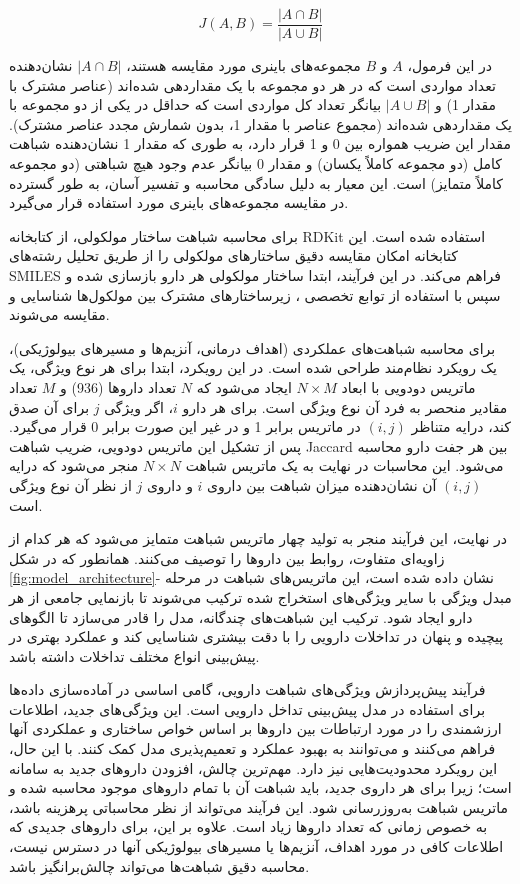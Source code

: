 \begin{equation}
	J(A,B) = \frac{|A \cap B|}{|A \cup B|}
\end{equation}

در این فرمول، $A$ و $B$ مجموعه‌های باینری مورد مقایسه هستند، $|A \cap B|$ نشان‌دهنده تعداد مواردی است که در هر دو مجموعه با یک مقداردهی شده‌اند (عناصر مشترک با مقدار 1) و $|A \cup B|$ بیانگر تعداد کل مواردی است که حداقل در یکی از دو مجموعه با یک مقداردهی شده‌اند (مجموع عناصر با مقدار 1، بدون شمارش مجدد عناصر مشترک). مقدار این ضریب همواره بین 0 و 1 قرار دارد، به طوری که مقدار 1 نشان‌دهنده شباهت کامل (دو مجموعه کاملاً یکسان) و مقدار 0 بیانگر عدم وجود هیچ شباهتی (دو مجموعه کاملاً متمایز) است. این معیار به دلیل سادگی محاسبه و تفسیر آسان، به طور گسترده در مقایسه مجموعه‌های باینری مورد استفاده قرار می‌گیرد.

برای محاسبه شباهت ساختار مولکولی، از کتابخانه RDKit استفاده شده است. این کتابخانه امکان مقایسه دقیق ساختارهای مولکولی را از طریق تحلیل رشته‌های SMILES فراهم می‌کند. در این فرآیند، ابتدا ساختار مولکولی هر دارو بازسازی شده و سپس با استفاده از توابع تخصصی ، زیرساختارهای مشترک بین مولکول‌ها شناسایی و مقایسه می‌شوند.

برای محاسبه شباهت‌های عملکردی (اهداف درمانی، آنزیم‌ها و مسیرهای بیولوژیکی)، یک رویکرد نظام‌مند طراحی شده است. در این رویکرد، ابتدا برای هر نوع ویژگی، یک ماتریس دودویی با ابعاد $N \times M$ ایجاد می‌شود که $N$ تعداد داروها (936) و $M$ تعداد مقادیر منحصر به فرد آن نوع ویژگی است. برای هر دارو $i$، اگر ویژگی $j$ برای آن صدق کند، درایه متناظر $(i,j)$ در ماتریس برابر 1 و در غیر این صورت برابر 0 قرار می‌گیرد. پس از تشکیل این ماتریس دودویی، ضریب شباهت Jaccard بین هر جفت دارو محاسبه می‌شود. این محاسبات در نهایت به یک ماتریس شباهت $N \times N$ منجر می‌شود که درایه $(i,j)$ آن نشان‌دهنده میزان شباهت بین داروی $i$ و داروی $j$ از نظر آن نوع ویژگی است.

در نهایت، این فرآیند منجر به تولید چهار ماتریس شباهت متمایز می‌شود که هر کدام از زاویه‌ای متفاوت، روابط بین داروها را توصیف می‌کنند. همانطور که در شکل \ref{fig:model_architecture}- نشان داده شده است، این ماتریس‌های شباهت در مرحله مبدل ویژگی با سایر ویژگی‌های استخراج شده ترکیب می‌شوند تا بازنمایی جامعی از هر دارو ایجاد شود. ترکیب این شباهت‌های چندگانه، مدل را قادر می‌سازد تا الگوهای پیچیده و پنهان در تداخلات دارویی را با دقت بیشتری شناسایی کند و عملکرد بهتری در پیش‌بینی انواع مختلف تداخلات داشته باشد.

فرآیند پیش‌پردازش ویژگی‌های شباهت دارویی، گامی اساسی در آماده‌سازی داده‌ها برای استفاده در مدل پیش‌بینی تداخل دارویی است. این ویژگی‌های جدید، اطلاعات ارزشمندی را در مورد ارتباطات بین داروها بر اساس خواص ساختاری و عملکردی آنها فراهم می‌کنند و می‌توانند به بهبود عملکرد و تعمیم‌پذیری مدل کمک کنند. با این حال، این رویکرد محدودیت‌هایی نیز دارد. مهم‌ترین چالش، افزودن داروهای جدید به سامانه است؛ زیرا برای هر داروی جدید، باید شباهت آن با تمام داروهای موجود محاسبه شده و ماتریس شباهت به‌روزرسانی شود. این فرآیند می‌تواند از نظر محاسباتی پرهزینه باشد، به خصوص زمانی که تعداد داروها زیاد است. علاوه بر این، برای داروهای جدیدی که اطلاعات کافی در مورد اهداف، آنزیم‌ها یا مسیرهای بیولوژیکی آنها در دسترس نیست، محاسبه دقیق شباهت‌ها می‌تواند چالش‌برانگیز باشد.

